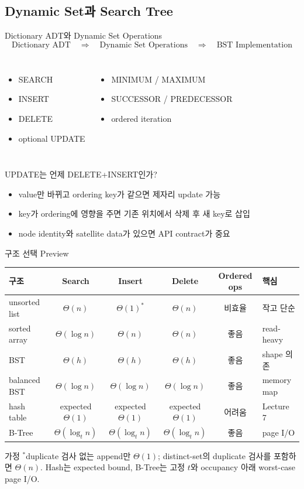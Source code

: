 \subsection{Dynamic Set과 Search Tree}
\begin{frame}{Dictionary ADT와 Dynamic Set Operations}
\[
\text{Dictionary ADT}\quad\Longrightarrow\quad
\text{Dynamic Set Operations}\quad\Longrightarrow\quad
\text{BST Implementation}
\]
\begin{columns}[T]
\begin{itemize}\item SEARCH\item INSERT\item DELETE\item optional UPDATE\end{itemize}
\begin{itemize}\item MINIMUM / MAXIMUM\item SUCCESSOR / PREDECESSOR\item ordered iteration\end{itemize}
\end{columns}
\end{frame}
\begin{frame}{UPDATE는 언제 DELETE+INSERT인가?}
\begin{itemize}
\item value만 바뀌고 ordering key가 같으면 제자리 update 가능
\item key가 ordering에 영향을 주면 기존 위치에서 삭제 후 새 key로 삽입
\item node identity와 satellite data가 있으면 API contract가 중요
\end{itemize}
\end{frame}
\begin{frame}{구조 선택 Preview}
\scriptsize\centering\begin{tabular}{lccccl}\toprule
구조&Search&Insert&Delete&Ordered ops&핵심\\\midrule
unsorted list&$\Theta(n)$&$\Theta(1)^*$&$\Theta(n)$&비효율&작고 단순\\
sorted array&$\Theta(\log n)$&$\Theta(n)$&$\Theta(n)$&좋음&read-heavy\\
BST&$\Theta(h)$&$\Theta(h)$&$\Theta(h)$&좋음&shape 의존\\
balanced BST&$\Theta(\log n)$&$\Theta(\log n)$&$\Theta(\log n)$&좋음&memory map\\
hash table&expected $\Theta(1)$&expected $\Theta(1)$&expected $\Theta(1)$&어려움&Lecture 7\\
B-Tree&$\Theta(\log_t n)$&$\Theta(\log_t n)$&$\Theta(\log_t n)$&좋음&page I/O\\\bottomrule
\end{tabular}
\begin{block}{가정}
$^*$duplicate 검사 없는 append만 $\Theta(1)$; distinct-set의 duplicate 검사를 포함하면 $\Theta(n)$. Hash는 expected bound, B-Tree는 고정 $t$와 occupancy 아래 worst-case page I/O.
\end{block}
\end{frame}
